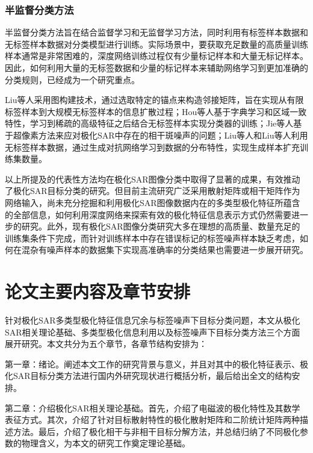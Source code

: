 \subsubsection{半监督分类方法}
半监督分类方法旨在结合监督学习和无监督学习方法，同时利用有标签样本数据和无标签样本数据对分类模型进行训练。实际场景中，要获取充足数量的高质量训练样本通常是非常困难的，深度网络训练过程仅有少量标记样本和大量无标记样本。因此，如何利用大量的无标签数据和少量的标记样本来辅助网络学习到更加准确的分类规则，已经成为一个研究重点。

Liu等人采用图构建技术，通过选取特定的锚点来构造邻接矩阵，旨在实现从有限标签样本到大规模无标签样本的信息扩散过程；Hou等人基于字典学习和区域一致特性，学习到稀疏的高级特征之后结合无标签样本实现分类器的训练；Jie等人基于超像素方法来应对极化SAR中存在的相干斑噪声的问题；Liu等人和Liu等人利用无标签样本数据，通过生成对抗网络学习到数据的分布特性，实现生成样本扩充训练集数量。


以上所提及的代表性方法均在极化SAR图像分类中取得了显著的成果，有效推动了极化SAR目标分类的研究。但目前主流研究广泛采用散射矩阵或相干矩阵作为网络输入，尚未充分挖掘和利用极化SAR图像数据内在的多类型极化特征所蕴含的全部信息，如何利用深度网络来探索有效的极化特征信息表示方式仍然需要进一步的研究。此外，现有极化SAR图像分类研究大多在理想的高质量、数量充足的训练集条件下完成，而针对训练样本中存在错误标记的标签噪声样本缺乏考虑，如何在混杂有噪声样本的数据集下实现高准确率的分类结果也需要进一步展开研究。

\section{论文主要内容及章节安排}
针对极化SAR多类型极化特征信息冗余与标签噪声下目标分类问题，本文从极化SAR相关理论基础、多类型极化信息利用以及标签噪声下目标分类方法三个方面展开研究。本文共分为五个章节，各章节结构安排为：

第一章：绪论。阐述本文工作的研究背景与意义，并且对其中的极化特征表示、极化SAR目标分类方法进行国内外研究现状进行概括分析，最后给出全文的结构安排。

第二章：介绍极化SAR相关理论基础。首先，介绍了电磁波的极化特性及其数学表征方式。其次，介绍了针对目标散射特性的极化散射矩阵和二阶统计矩阵两种描述方法。最后，介绍了极化相干与非相干目标分解方法，并总结归纳了不同极化参数的物理含义，为本文的研究工作奠定理论基础。

